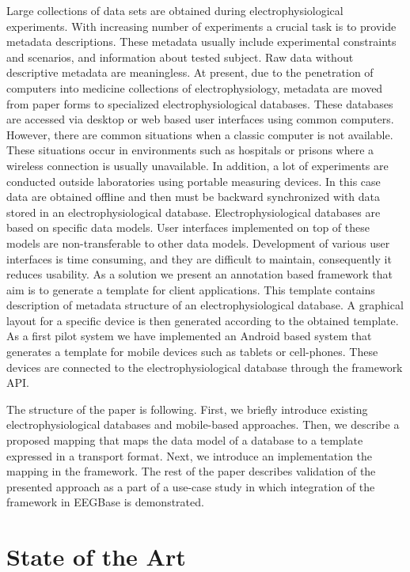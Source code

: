 \documentclass[a4paper,twoside]{article}
\begin{document}
Large collections of data sets are obtained during electrophysiological experiments. With increasing number of experiments a crucial task is to provide metadata descriptions. These metadata usually include experimental constraints and scenarios, and information about tested subject. Raw data without descriptive metadata are meaningless. At present, due to the penetration of computers into medicine collections of electrophysiology, metadata are moved from paper forms to specialized electrophysiological databases. These databases are accessed via desktop or web based user interfaces using common computers. However, there are common situations when a classic computer is not available. These situations occur in environments such as hospitals or prisons where a wireless connection is usually unavailable. In addition, a lot of experiments are conducted outside laboratories using portable measuring devices. In this case data are obtained offline and then must be backward synchronized with data stored in an electrophysiological database. Electrophysiological databases are based on specific data models. User interfaces implemented on top of these models are non-transferable to other data models. Development of various user interfaces is time consuming, and they are difficult to maintain, consequently it reduces usability. As a solution we present an annotation based framework that aim is to generate a template for client applications. This template contains description of metadata structure of an electrophysiological database. A graphical layout for a specific device is then generated according to the obtained template.  As a first pilot system we have implemented an Android based system that generates a template for mobile devices such as tablets or cell-phones. These devices are connected to the electrophysiological database through the framework API.

The structure of the paper is following. First, we briefly introduce existing electrophysiological databases and mobile-based approaches. Then, we describe a proposed mapping that maps the data model of a database to a template expressed in a transport format. Next, we introduce an implementation the mapping in the framework. The rest of the paper describes validation of the presented approach as a part of a use-case study in which integration of the framework in EEGBase \cite{ISI:000306821100004} is demonstrated.

\section{State of the Art}
\end{document}
